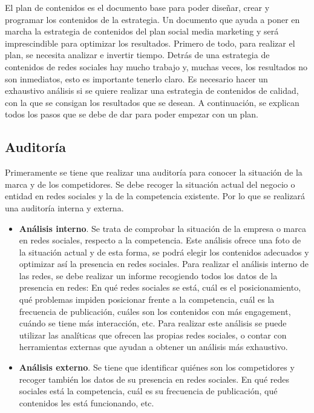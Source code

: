 El plan de contenidos es el documento base para poder diseñar, crear y programar los contenidos de la estrategia. Un documento que ayuda a poner en marcha la estrategia de contenidos del plan social media marketing y será imprescindible para optimizar los resultados. Primero de todo, para realizar el plan, se necesita analizar e invertir tiempo. Detrás de una estrategia de contenidos de redes sociales hay mucho trabajo y, muchas veces, los resultados no son inmediatos, esto es importante tenerlo claro. Es necesario hacer un exhaustivo análisis si se quiere realizar una estrategia de contenidos de calidad, con la que se consigan los resultados que se desean. A continuación, se explican todos los pasos que se debe de dar para poder empezar con un plan. 

\subsection{Auditoría}

Primeramente se tiene que realizar una auditoría para conocer la situación de la marca y de los competidores. Se debe recoger la situación actual del negocio o entidad en redes sociales y la de la competencia existente. Por lo que se realizará una auditoría interna y externa. 

\begin{itemize}
    \item \textbf{Análisis interno}. Se trata de comprobar la situación de la empresa o marca en redes sociales, respecto a la competencia. Este análisis ofrece una foto de la situación actual y de esta forma, se podrá elegir los contenidos adecuados y  optimizar así la presencia en redes sociales. Para realizar el análisis interno de las redes, se debe realizar un informe recogiendo todos los datos de la presencia en redes: En qué redes sociales se está, cuál es el posicionamiento, qué problemas impiden posicionar frente a la competencia, cuál es la frecuencia de publicación, cuáles son los contenidos con más engagement, cuándo se tiene más interacción, etc. Para realizar este análisis se puede utilizar las analíticas que ofrecen las propias redes sociales, o contar con herramientas externas que ayudan a obtener un análisis más exhaustivo.
    \item \textbf{Análisis externo}. Se tiene que identificar quiénes son los competidores y recoger también los datos de su presencia en redes sociales. En qué redes sociales está la competencia, cuál es su frecuencia de publicación, qué contenidos les está funcionando, etc.
\end{itemize}

